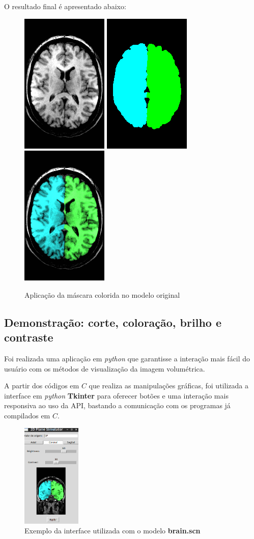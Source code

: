             O resultado final é apresentado abaixo:

            \begin{figure}[ht!]
                \centering
                \includegraphics[width=.75in]{figures/example}
                \includegraphics[width=.75in]{figures/label}
                \includegraphics[width=.75in]{figures/color}
                \caption{Aplicação da máscara colorida no modelo original}
            \end{figure}


    \subsection{Demonstração: corte, coloração, brilho e contraste}
        Foi realizada uma aplicação em \textit{python} que garantisse a interação mais fácil do usuário com os métodos de visualização da imagem volumétrica. 

        A partir dos códigos em $C$ que realiza as manipulações gráficas, foi utilizada a interface em \textit{python} \textbf{Tkinter} para oferecer botões e uma interação mais responsiva ao uso da API, bastando a comunicação com os programas já compilados em $C$.

        \begin{figure}[ht!]
            \centering
            \includegraphics[width=1.1in]{figures/UI_BC}
            \caption{Exemplo da interface utilizada com o modelo \textbf{brain.scn}}
        \end{figure}

